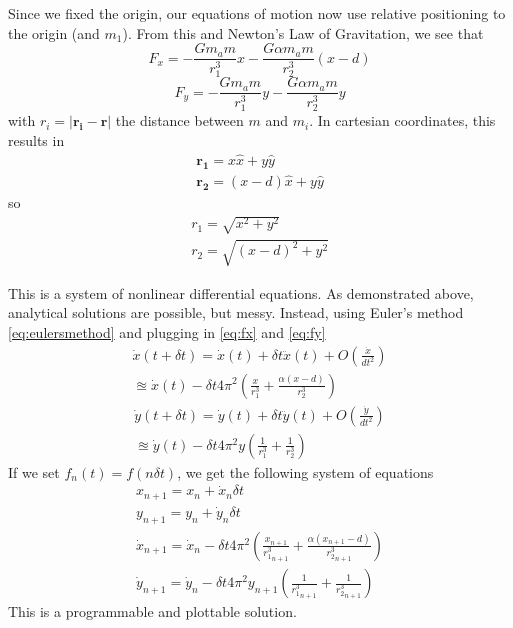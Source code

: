 \documentclass[preprint,titlepage,preprintnumbers,amsmath,amssymb,aps,11pt]{revtex4-2}
\begin{document}
Since we fixed the origin, our equations of motion now use relative positioning to the origin (and $m_1$). From this and Newton's Law of Gravitation, we see that
\begin{equation}
    F_x=-\frac{Gm_a m}{r_1^3}x-\frac{G\alpha m_a m}{r_2^3}(x-d)
    \label{eq:fx}
\end{equation}
\begin{equation}
    F_y=-\frac{Gm_a m}{r_1^3}y-\frac{G\alpha m_a m}{r_2^3}y
    \label{eq:fy}
\end{equation}
with $r_i=|\bm{r_i}-\bm{r}|$ the distance between $m$ and $m_i$. In cartesian coordinates, this results in
\begin{equation}
    \begin{aligned}
        \bm{r_1}=x\hat{x}+y\hat{y}\\
        \bm{r_2}=(x-d)\hat{x}+y\hat{y}
    \end{aligned}
\end{equation}
so
\begin{equation}
    \begin{aligned}
        r_1=\sqrt{x^2+y^2}\\
        r_2=\sqrt{(x-d)^2+y^2}
    \end{aligned}
\end{equation}

This is a system of nonlinear differential equations. As demonstrated above, analytical solutions are possible, but messy. Instead, using Euler's method \ref{eq:eulersmethod} and plugging in \ref{eq:fx} and \ref{eq:fy}
\begin{equation}
    \begin{aligned}
        \dot{x}(t+\delta t)=\dot{x}(t)+\delta t\ddot{x}(t)+O(\frac{\dot{x}}{dt^2})\\
        \approxeq\dot{x}(t)-\delta t4\pi^2(\frac{x}{r_1^3}+\frac{\alpha(x-d)}{r_2^3})
    \end{aligned}
\end{equation}
\begin{equation}
    \begin{aligned}
        \dot{y}(t+\delta t)=\dot{y}(t)+\delta t\ddot{y}(t)+O(\frac{\dot{y}}{dt^2})\\
        \approxeq\dot{y}(t)-\delta t4\pi^2y(\frac{1}{r_1^3}+\frac{1}{r_2^3})
    \end{aligned}
\end{equation}
If we set $f_n(t)=f(n\delta t)$, we get the following system of equations
\begin{equation}
    \begin{aligned}
        x_{n+1}=x_n+\dot{x}_n\delta t\\
        y_{n+1}=y_n+\dot{y}_n\delta t\\
        \dot{x}_{n+1}=\dot{x}_n-\delta t4\pi^2(\frac{x_{n+1}}{{r_1^3}_{n+1}}+\frac{\alpha(x_{n+1}-d)}{{r_2^3}_{n+1}})\\
        \dot{y}_{n+1}=\dot{y}_n-\delta t4\pi^2y_{n+1}(\frac{1}{{r_1^3}_{n+1}}+\frac{1}{{r_2^3}_{n+1}})
    \end{aligned}
\end{equation}
This is a programmable and plottable solution.
\end{document}
